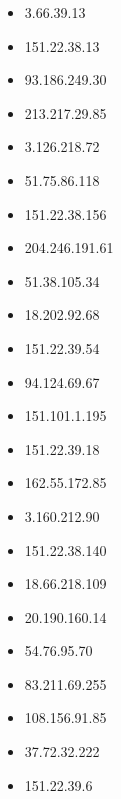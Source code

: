 \documentclass{article}
\begin{document}
\begin{itemize}
        \item 3.66.39.13
    
        \item 151.22.38.13
    
        \item 93.186.249.30
    
        \item 213.217.29.85
    
        \item 3.126.218.72
    
        \item 51.75.86.118
    
        \item 151.22.38.156
    
        \item 204.246.191.61
    
        \item 51.38.105.34
    
        \item 18.202.92.68
    
        \item 151.22.39.54
    
        \item 94.124.69.67
    
        \item 151.101.1.195
    
        \item 151.22.39.18
    
        \item 162.55.172.85
    
        \item 3.160.212.90
    
        \item 151.22.38.140
    
        \item 18.66.218.109
    
        \item 20.190.160.14
    
        \item 54.76.95.70
    
        \item 83.211.69.255
    
        \item 108.156.91.85
    
        \item 37.72.32.222
    
        \item 151.22.39.6
    

\end{itemize}
\end{document}
